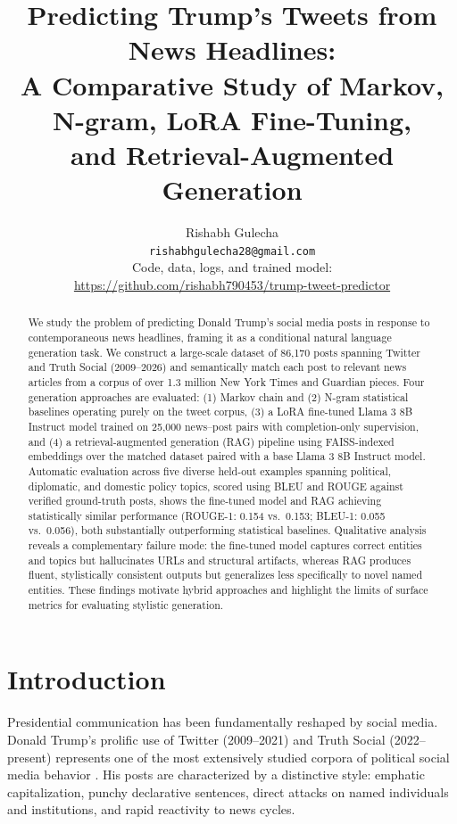 \documentclass[11pt,a4paper]{article}
\title{\textbf{Predicting Trump's Tweets from News Headlines:\\
A Comparative Study of Markov, N-gram, LoRA Fine-Tuning,\\
and Retrieval-Augmented Generation}}
\author{
  Rishabh Gulecha\\
  \texttt{rishabhgulecha28@gmail.com}\\[4pt]
  \small Code, data, logs, and trained model:\\
  \small \url{https://github.com/rishabh790453/trump-tweet-predictor}
}
\date{}
\begin{document}
\maketitle

\begin{abstract}
We study the problem of predicting Donald Trump's social media posts in response to contemporaneous news headlines, framing it as a conditional natural language generation task. We construct a large-scale dataset of 86,170 posts spanning Twitter and Truth Social (2009--2026) and semantically match each post to relevant news articles from a corpus of over 1.3 million New York Times and Guardian pieces. Four generation approaches are evaluated: (1) Markov chain and (2) N-gram statistical baselines operating purely on the tweet corpus, (3) a LoRA fine-tuned Llama 3 8B Instruct model trained on 25,000 news--post pairs with completion-only supervision, and (4) a retrieval-augmented generation (RAG) pipeline using FAISS-indexed embeddings over the matched dataset paired with a base Llama 3 8B Instruct model. Automatic evaluation across five diverse held-out examples spanning political, diplomatic, and domestic policy topics, scored using BLEU and ROUGE against verified ground-truth posts, shows the fine-tuned model and RAG achieving statistically similar performance (ROUGE-1: 0.154 vs.\ 0.153; BLEU-1: 0.055 vs.\ 0.056), both substantially outperforming statistical baselines. Qualitative analysis reveals a complementary failure mode: the fine-tuned model captures correct entities and topics but hallucinates URLs and structural artifacts, whereas RAG produces fluent, stylistically consistent outputs but generalizes less specifically to novel named entities. These findings motivate hybrid approaches and highlight the limits of surface metrics for evaluating stylistic generation.
\end{abstract}

\section{Introduction}

Presidential communication has been fundamentally reshaped by social media. Donald Trump's prolific use of Twitter (2009--2021) and Truth Social (2022--present) represents one of the most extensively studied corpora of political social media behavior \citep{bovet2019influence,wells2016trump}. His posts are characterized by a distinctive style: emphatic capitalization, punchy declarative sentences, direct attacks on named individuals and institutions, and rapid reactivity to news cycles.
\end{document}

